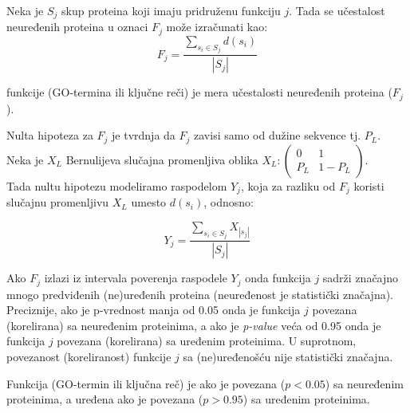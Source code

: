 Neka je $S_j$ skup proteina koji imaju pridruženu funkciju $j$. Tada se učestalost
neuređenih proteina u oznaci $F_j$ može izračunati kao:
$$F_j = \dfrac{\sum_{s_i \in S_j} d(s_i)} {|S_j|} $$


\begin{definicija}
  \label{neuredjenost}

   funkcije (GO-termina ili ključne reči) je mera učestalosti
  neuređenih proteina ($F_j$).
\end{definicija}


Nulta hipoteza za $F_j$ je tvrdnja da $F_j$ zavisi samo od dužine sekvence tj. $P_L$. \\
Neka je $X_L$ Bernulijeva slučajna promenljiva oblika $X_L : \begin{pmatrix} 0 & 1\\ P_L & 1-P_L \end{pmatrix}$. \\
Tada nultu hipotezu modeliramo raspodelom $Y_j$, koja za razliku od $F_j$ koristi
slučajnu promenljivu $X_L$ umesto  $d(s_i)$, odnosno:



$$ Y_j = \dfrac {\sum_{s_i \in S_j} {X_{|s_j|}}}{|S_j|}$$

Ako $F_j$ izlazi iz intervala poverenja raspodele $Y_j$ onda funkcija $j$
sadrži značajno mnogo predviđenih (ne)uređenih proteina (neuređenost je
statistički značajna).
Preciznije, ako je p-vrednost  manja od 0.05 onda je funkcija $j$
povezana (korelirana) sa neuređenim proteinima, a ako je \textit{p-value} veća
od 0.95 onda je funkcija $j$ povezana (korelirana) sa uređenim proteinima. U
suprotnom, povezanost (koreliranost) funkcije $j$ sa (ne)uređenošću nije
statistički značajna.  

\begin{definicija}
  \label{neuredjena_funkcija}
  Funkcija (GO-termin ili ključna reč) je  ako je povezana
  ($p<0.05$) sa neuređenim proteinima, a uređena ako je povezana ($p>0.95$) sa
  uređenim proteinima.
\end{definicija}


